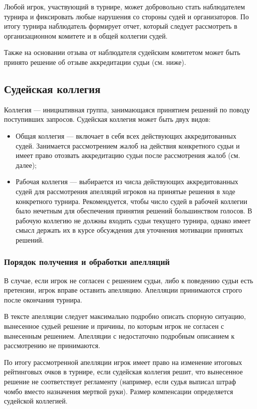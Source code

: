 Любой игрок, участвующий в турнире, может добровольно стать наблюдателем турнира и фиксировать любые нарушения со стороны судей и организаторов. По итогу турнира наблюдатель формирует отчет, который следует рассмотреть в организационном комитете и в общей коллегии судей.

Также на основании отзыва от наблюдателя судейским комитетом может быть принято решение об отзыве аккредитации судьи (см. ниже).

\subsection{Судейская коллегия}

Коллегия --- инициативная группа, занимающаяся принятием решений по поводу поступивших запросов. Судейская коллегия может быть двух видов:

\begin{itemize}
	\item Общая коллегия --- включает в себя всех действующих аккредитованных судей. Занимается рассмотрением жалоб на действия конкретного судьи и имеет право отозвать аккредитацию судьи после рассмотрения жалоб (см. далее);
	\item Рабочая коллегия --- выбирается из числа действующих аккредитованных судей для рассмотрения апелляций игроков на принятые решения в ходе конкретного турнира. Рекомендуется, чтобы число судей в рабочей коллегии было нечетным для обеспечения принятия решений большинством голосов. В рабочую коллегию не должны входить судьи текущего турнира, однако имеет смысл держать их в курсе обсуждения для уточнения мотивации принятых решений.
\end{itemize}

\subsubsection{Порядок получения и обработки апелляций}

В случае, если игрок не согласен с решением судьи, либо к поведению судьи есть претензии, игрок вправе оставить апелляцию. Апелляции принимаются строго после окончания турнира.

В тексте апелляции следует максимально подробно описать спорную ситуацию, вынесенное судьей решение и причины, по которым игрок не согласен с вынесенным решением. Апелляции с недостаточно подробным описанием к рассмотрению не принимаются.

По итогу рассмотренной апелляции игрок имеет право на изменение итоговых рейтинговых очков в турнире, если судейская коллегия решит, что вынесенное решение не соответствует регламенту (например, если судья выписал штраф чомбо вместо назначения мертвой руки). Размер компенсации определяется судейской коллегией. 

